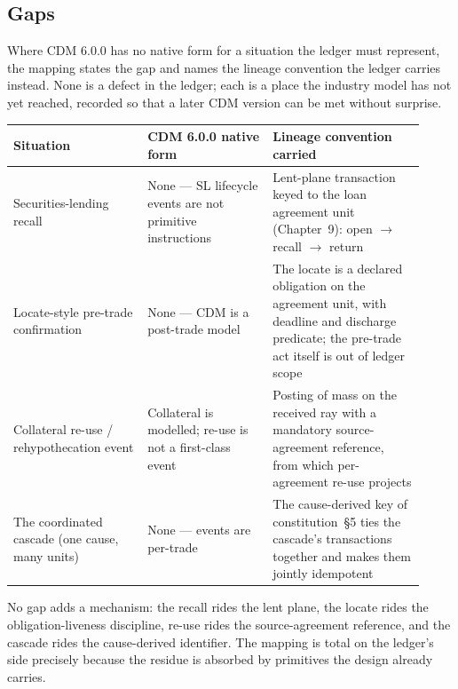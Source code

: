 \subsection{Gaps}

Where CDM 6.0.0 has no native form for a situation the ledger must represent,
the mapping states the gap and names the lineage convention the ledger carries
instead. None is a defect in the ledger; each is a place the industry model has
not yet reached, recorded so that a later CDM version can be met without
surprise.

\begin{center}
\small
\begin{tabular}{@{}p{0.30\linewidth}p{0.28\linewidth}p{0.34\linewidth}@{}}
\toprule
\textbf{Situation} & \textbf{CDM 6.0.0 native form} & \textbf{Lineage convention carried} \\
\midrule
Securities-lending recall & None --- SL lifecycle events are not primitive
  instructions & Lent-plane transaction keyed to the loan agreement unit
  (Chapter~9): open $\to$ recall $\to$ return \\
Locate-style pre-trade confirmation & None --- CDM is a post-trade model & The
  locate is a declared obligation on the agreement unit, with deadline and
  discharge predicate; the pre-trade act itself is out of ledger scope \\
Collateral re-use / rehypothecation event & Collateral is modelled; re-use is
  not a first-class event & Posting of mass on the received ray with a
  mandatory source-agreement reference, from which per-agreement re-use projects \\
The coordinated cascade (one cause, many units) & None --- events are
  per-trade & The cause-derived key of constitution~\S5 ties the cascade's
  transactions together and makes them jointly idempotent \\
\bottomrule
\end{tabular}
\end{center}

No gap adds a mechanism: the recall rides the lent plane, the locate rides the
obligation-liveness discipline, re-use rides the source-agreement reference, and
the cascade rides the cause-derived identifier. The mapping is total on the
ledger's side precisely because the residue is absorbed by primitives the design
already carries.
